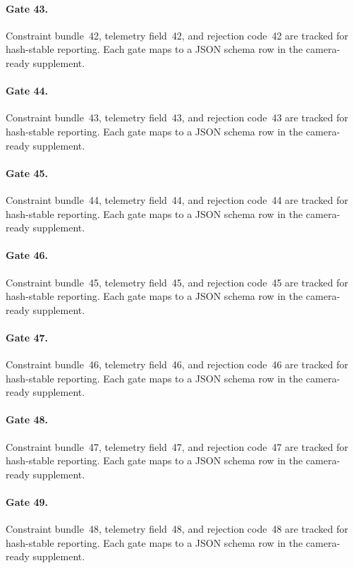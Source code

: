 \documentclass[sigconf,nonacm]{acmart}
\begin{document}
\paragraph{Gate 43.}
Constraint bundle~42, telemetry field~42, and rejection code~42 are tracked for hash-stable reporting. Each gate maps to a JSON schema row in the camera-ready supplement. %

\paragraph{Gate 44.}
Constraint bundle~43, telemetry field~43, and rejection code~43 are tracked for hash-stable reporting. Each gate maps to a JSON schema row in the camera-ready supplement. %

\paragraph{Gate 45.}
Constraint bundle~44, telemetry field~44, and rejection code~44 are tracked for hash-stable reporting. Each gate maps to a JSON schema row in the camera-ready supplement. %

\paragraph{Gate 46.}
Constraint bundle~45, telemetry field~45, and rejection code~45 are tracked for hash-stable reporting. Each gate maps to a JSON schema row in the camera-ready supplement. %

\paragraph{Gate 47.}
Constraint bundle~46, telemetry field~46, and rejection code~46 are tracked for hash-stable reporting. Each gate maps to a JSON schema row in the camera-ready supplement. %

\paragraph{Gate 48.}
Constraint bundle~47, telemetry field~47, and rejection code~47 are tracked for hash-stable reporting. Each gate maps to a JSON schema row in the camera-ready supplement. %

\paragraph{Gate 49.}
Constraint bundle~48, telemetry field~48, and rejection code~48 are tracked for hash-stable reporting. Each gate maps to a JSON schema row in the camera-ready supplement. %
\end{document}
